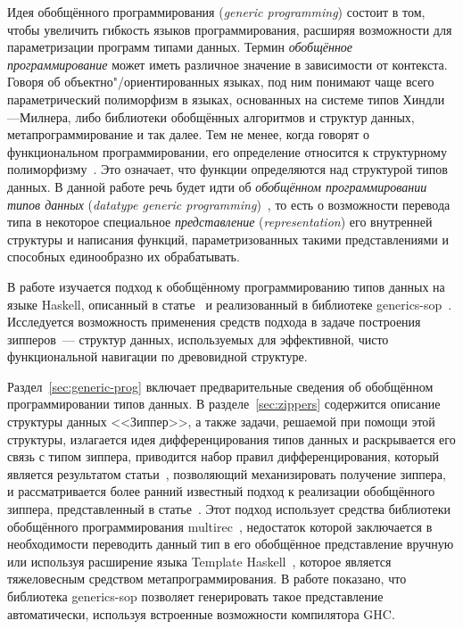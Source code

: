 





\Intro

Идея обобщённого программирования (\textsl{generic programming})
состоит в том, чтобы увеличить гибкость языков программирования,
расширяя возможности для параметризации программ типами данных.
Термин \emph{обобщённое программирование} может иметь различное
значение в зависимости от контекста. Говоря об
объектно"/ориентированных языках, под ним понимают чаще всего
параметрический полиморфизм в языках, основанных на системе типов
Хиндли---Милнера, либо библиотеки обобщённых алгоритмов и
структур данных, метапрограммирование и так далее. Тем не менее,
когда говорят о функциональном программировании, его определение
относится к структурному полиморфизму~\cite{Loh2004}. Это
означает, что функции определяются над структурой типов данных. В
данной работе речь будет идти об \emph{обобщённом
программировании типов данных} (\textsl{datatype generic
programming})~\cite{Gib2007}, то есть о возможности перевода типа
в некоторое специальное \emph{представление}
(\textsl{representation}) его внутренней структуры и написания
функций, параметризованных такими представлениями и способных
единообразно их обрабатывать.

В работе изучается подход к обобщённому программированию типов
данных на языке Haskell, описанный в статье~\cite{VriLoh2014} и
реализованный в библиотеке \textsf{generics-sop}~\cite{generics-sop}.
Исследуется возможность применения средств подхода в задаче
построения зипперов~--- структур данных, используемых для
эффективной, чисто функциональной навигации по древовидной
структуре.

Раздел~\ref{sec:generic-prog} включает предварительные сведения об
обобщённом программировании типов данных. В
разделе~\ref{sec:zippers} содержится описание структуры данных
<<Зиппер>>, а также задачи, решаемой при помощи этой структуры,
излагается идея дифференцирования типов данных и раскрывается его
связь с типом зиппера, приводится набор правил дифференцирования,
который является результатом статьи~\cite{McBr2001}, позволяющий
механизировать получение зиппера, и рассматривается более ранний
известный подход к реализации обобщённого зиппера,
представленный в статье~\cite{MuRec2009}. Этот подход использует
средства библиотеки обобщённого программирования
\textsf{multirec}~\cite{multirec}, недостаток которой заключается в
необходимости переводить данный тип в его обобщённое
представление вручную или используя расширение языка
\textsf{Template Haskell}~\cite{multirec-th}, которое является
тяжеловесным средством метапрограммирования. В работе показано,
что библиотека \textsf{generics-sop} позволяет генерировать такое
представление автоматически, используя встроенные возможности
компилятора \textsf{GHC}.

